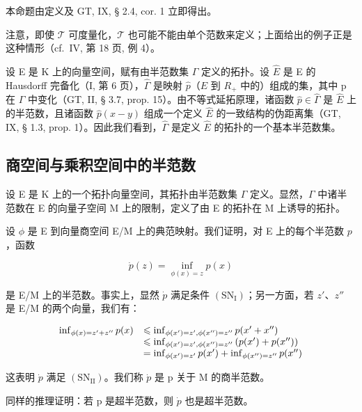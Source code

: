 本命题由定义及 GT, IX, § 2.4, cor. 1 立即得出。

注意，即使 \(\mathcal{T}\) 可度量化，\(\mathcal{T}\) 也可能不能由单个范数来定义；上面给出的例子正是这种情形（cf.~IV, 第 18 页, 例 4）。

设 E 是 K 上的向量空间，赋有由半范数集 \(\Gamma\) 定义的拓扑。设 \(\hat{E}\) 是 E 的 Hausdorff 完备化（I, 第 6 页），\(\hat{\Gamma}\) 是映射 \(\hat{p}\)（\(\hat{E}\) 到 \(R_{+}\) 中的）组成的集，其中 p 在 \(\Gamma\) 中变化（GT, II, § 3.7, prop. 15）。由不等式延拓原理，诸函数 \(\hat{p} \in \hat{\Gamma}\) 是 \(\hat{E}\) 上的半范数，且诸函数 \(\hat{p}(x - y)\) 组成一个定义 \(\hat{E}\) 的一致结构的伪距离集（GT, IX, § 1.3, prop. 1）。因此我们看到，\(\hat{\Gamma}\) 是定义 \(\hat{E}\) 的拓扑的一个基本半范数集。

\subsection{商空间与乘积空间中的半范数}

设 E 是 K 上的一个拓扑向量空间，其拓扑由半范数集 \(\Gamma\) 定义。显然，\(\Gamma\) 中诸半范数在 E 的向量子空间 M 上的限制，定义了由 E 的拓扑在 M 上诱导的拓扑。

设 \(\phi\) 是 E 到向量商空间 E/M 上的典范映射。我们证明，对 E 上的每个半范数 \(p\)，函数

\[
\dot {p} (z) = \inf _ {\phi (x) = z} p (x)\tag{3}
\]

是 E/M 上的半范数。事实上，显然 \(\dot{p}\) 满足条件 \((\mathrm{SN}_{\mathrm{I}})\)；另一方面，若 \(z'\)、\(z''\) 是 E/M 的两个向量，我们有：

\[
\begin{array}{r l} \inf _ {\phi (x) = z ^ {\prime} + z ^ {\prime \prime}} p (x) & \leqslant \inf _ {\phi (x ^ {\prime}) = z ^ {\prime}, \phi (x ^ {\prime \prime}) = z ^ {\prime \prime}} p (x ^ {\prime} + x ^ {\prime \prime}) \\ & \leqslant \inf _ {\phi (x ^ {\prime}) = z ^ {\prime}, \phi (x ^ {\prime \prime}) = z ^ {\prime \prime}} \left(p (x ^ {\prime}) + p (x ^ {\prime \prime})\right) \\ & = \inf _ {\phi (x ^ {\prime}) = z ^ {\prime}} p (x ^ {\prime}) + \inf _ {\phi (x ^ {\prime \prime}) = z ^ {\prime \prime}} p (x ^ {\prime \prime}) \end{array}
\]

这表明 \(\dot{p}\) 满足 \((\mathrm{SN}_{\mathrm{II}})\)。我们称 \(\dot{p}\) 是 p 关于 M 的商半范数。

同样的推理证明：若 p 是超半范数，则 \(\dot{p}\) 也是超半范数。

